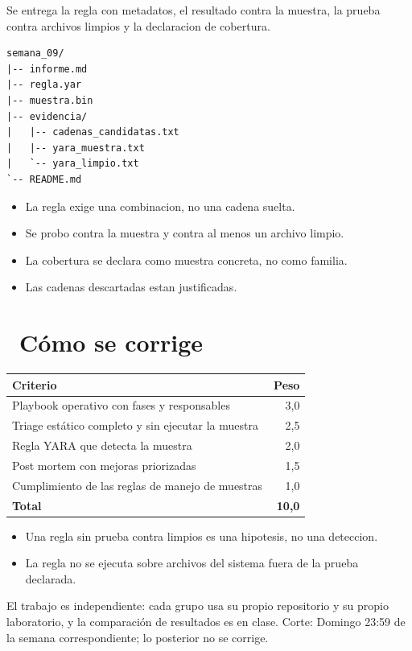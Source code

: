 \documentclass[11pt,a4paper]{article}
\newcommand{\iconotexto}[2]{\textcolor{cyanNeon}{\faIcon{#1}}~#2}
\begin{document}
Se entrega la regla con metadatos, el resultado contra la muestra, la prueba contra archivos limpios y la declaracion de cobertura.

\begin{lstlisting}[style=estiloCodigo]
semana_09/
|-- informe.md
|-- regla.yar
|-- muestra.bin
|-- evidencia/
|   |-- cadenas_candidatas.txt
|   |-- yara_muestra.txt
|   `-- yara_limpio.txt
`-- README.md
\end{lstlisting}

\begin{itemize}[leftmargin=1.4em,itemsep=2pt,topsep=3pt]
  \item La regla exige una combinacion, no una cadena suelta.
  \item Se probo contra la muestra y contra al menos un archivo limpio.
  \item La cobertura se declara como muestra concreta, no como familia.
  \item Las cadenas descartadas estan justificadas.
\end{itemize}

\section{\iconotexto{ruler-combined}{Cómo se corrige}}

\begin{tabularx}{\linewidth}{@{}X r@{}}
\toprule
Criterio & Peso\\
\midrule
Playbook operativo con fases y responsables & 3,0 \\
Triage estático completo y sin ejecutar la muestra & 2,5 \\
Regla YARA que detecta la muestra & 2,0 \\
Post mortem con mejoras priorizadas & 1,5 \\
Cumplimiento de las reglas de manejo de muestras & 1,0 \\
\midrule
\textbf{Total} & \textbf{10,0}\\
\bottomrule
\end{tabularx}

\begin{itemize}[leftmargin=1.4em,itemsep=2pt,topsep=3pt]
  \item Una regla sin prueba contra limpios es una hipotesis, no una deteccion.
  \item La regla no se ejecuta sobre archivos del sistema fuera de la prueba declarada.
\end{itemize}

\begin{cajaRecuerda}El trabajo es independiente: cada grupo usa su propio repositorio y su propio laboratorio, y la comparación de resultados es en clase. Corte: Domingo 23:59 de la semana correspondiente; lo posterior no se corrige.
\end{cajaRecuerda}
\end{document}
